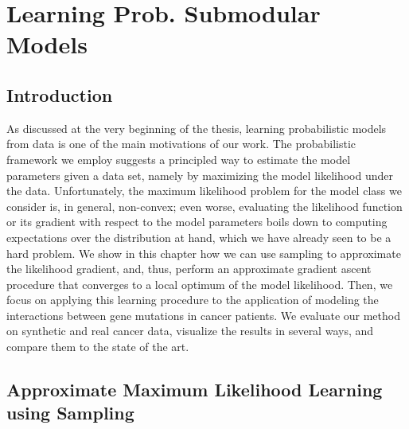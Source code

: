 \chapter{Learning Prob. Submodular Models} \label{ch:genes}

\section{Introduction}
As discussed at the very beginning of the thesis, learning probabilistic models from data is one of the main motivations of our work.
The probabilistic framework we employ suggests a principled way to estimate the model parameters given a data set, namely by maximizing the model likelihood under the data.
Unfortunately, the maximum likelihood problem for the model class we consider is, in general, non-convex; even worse, evaluating the likelihood function or its gradient with respect to the model parameters boils down to computing expectations over the distribution at hand, which we have already seen to be a hard problem.
We show in this chapter how we can use sampling to approximate the likelihood gradient, and, thus, perform an approximate gradient ascent procedure that converges to a local optimum of the model likelihood.
Then, we focus on applying this learning procedure to the application of modeling the interactions between gene mutations in cancer patients.
We evaluate our method on synthetic and real cancer data, visualize the results in several ways, and compare them to the state of the art.


\section{Approximate Maximum Likelihood Learning using Sampling} \label{sect:ml}

